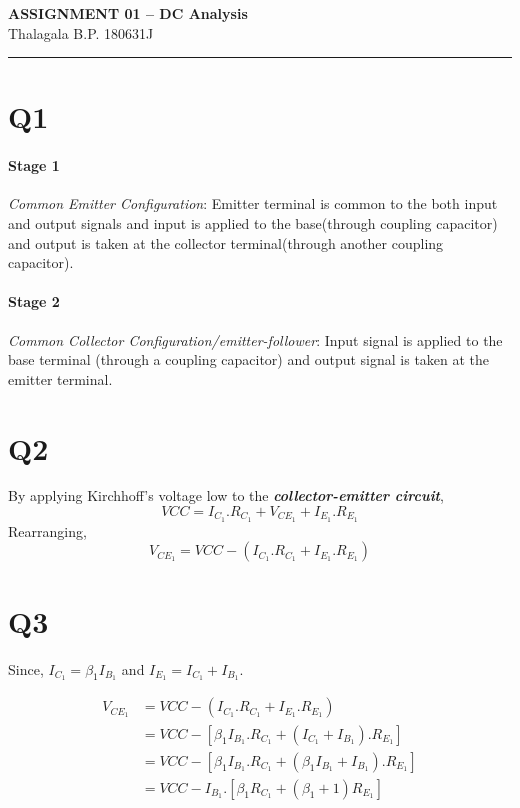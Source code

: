 
	\begin{center}
		{\large \textbf{ASSIGNMENT 01 – DC Analysis}}\\
		Thalagala B.P.\hspace{0.5cm} 180631J
	\end{center}
	\hrule

\section*{Q1}
\paragraph*{Stage 1} \textit{Common Emitter Configuration}: Emitter terminal is common to the both input and output signals and input is applied to the base(through coupling capacitor) and output is taken at the collector terminal(through another coupling capacitor).

\paragraph*{Stage 2} \textit{Common Collector Configuration/emitter-follower}: Input signal is applied to the base terminal (through a coupling capacitor)  and output signal is taken at the emitter terminal.

\section*{Q2}
By applying Kirchhoff's voltage low to the \textbf{\textit{collector-emitter circuit}},
\[VCC = I_{C_1}.R_{C_1} + V_{CE_1} + I_{E_1}.R_{E_1}\]
Rearranging,
\[	 V_{CE_1}  = VCC -\left(I_{C_1}.R_{C_1} + I_{E_1}.R_{E_1} \right) \]

\section*{Q3}

Since, $I_{C_1} = \beta_1 I_{B_1}$ and $I_{E_1} = I_{C_1} + I_{B_1}$.

\[
\begin{split}
	V_{CE_1}  &= VCC -\left(I_{C_1}.R_{C_1} + I_{E_1}.R_{E_1} \right)\\
	&= VCC -\left[\beta_1 I_{B_1}.R_{C_1} + \left(I_{C_1} + I_{B_1} \right).R_{E_1} \right]\\
	&= VCC -\left[\beta_1 I_{B_1}.R_{C_1} + \left( \beta_1 I_{B_1} + I_{B_1} \right).R_{E_1} \right]\\
	& =  VCC -I_{B_1}.\left[\beta_1R_{C_1} + \left(\beta_1+1\right)R_{E_1} \right]
\end{split}
\]

